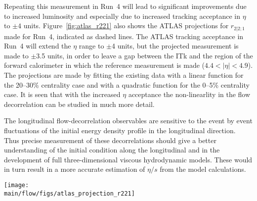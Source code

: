 Repeating this measurement in Run~4 will lead to significant improvements 
  due to increased luminosity and especially due to increased tracking 
  acceptance in $\eta$ to $\pm4$ units.
Figure~\ref{fig:atlas_r221} also shows the ATLAS projections for 
  $r_{2|2;1}$ made for Run~4, indicated as dashed lines.
The ATLAS tracking acceptance in Run~4 will extend the $\eta$ range 
  to $\pm$4 units, but the projected measurement is made
  to $\pm$3.5 units, in order to leave a gap between the ITk and the 
  region of the forward calorimeter in which the reference measurement 
  is made ($4.4<|\eta|<4.9$).
The projections are made by fitting the existing data with a linear 
  function for the 20--30\% centrality case and with a quadratic 
  function for the 0--5\% centrality case.
It is seen that with the increased $\eta$ acceptance the non-linearlity 
  in the flow decorrelation can be studied in much more detail.


The longitudinal flow-decorrelation observables are sensitive to the 
  event by event fluctuations of the initial energy density profile 
  in the longitudinal direction. 
Thus precise measurement of these decorrelations should give
  a better understanding of the initial condition along the 
  longitudinal and in the development of full three-dimensional 
  viscous hydrodynamic models.
These would in turn result in a more accurate estimation of 
  $\eta/s$ from the model calculations.




\begin{figure*}[!htb]
\begin{center}
\texttt{[image: \\main/flow/figs/atlas\_projection\_r221]}
\caption{
ATLAS measurements of the flow-decorrelation observable $r_{2|2;1}$ 
  as a function of $\eta$.
The markers indicate the present measurements from Ref.~\cite{HION-2016-04}.
The left and right panels show results for the 0--5\% and 20--30\%
  centrality intervals,  respectively.
The dashed lines show ATLAS projections of $r_{2|2;1}$ as expected to 
  be measured in Run~4.  
The width of the projection bands indicates the expected statistical uncertainty.
}
\label{fig:atlas_r221}
\end{center}
\end{figure*}

